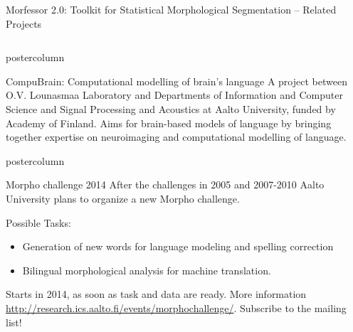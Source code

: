 \documentclass[final]{beamer} %
\newcommand{\collspace}{\vspace{6mm}}
\begin{document}
\begin{frame}{Morfessor 2.0: Toolkit for Statistical Morphological Segmentation -- Related Projects}
\begin{columns}
\begin{column}{.49\textwidth}
\begin{beamercolorbox}[center,wd=\textwidth]{postercolumn}
\begin{block}{CompuBrain: Computational modelling of brain's language}
A project between O.V. Lounasmaa Laboratory and Departments of
Information and Computer Science and Signal Processing and
 Acoustics at Aalto University, funded by Academy of Finland. Aims
 for brain-based models of language by bringing together expertise
 on neuroimaging and computational modelling of language.
            \end{block}
            
	\end{beamercolorbox}
\vfill
\collspace


  \begin{beamercolorbox}[center,wd=\textwidth]{postercolumn}
 \begin{block}{Morpho challenge 2014}
            After the challenges in 2005 and 2007-2010 Aalto University plans to organize a new Morpho challenge.

	Possible Tasks:       \begin{itemize}
		\item Generation of new words for language modeling and spelling correction
\item Bilingual morphological analysis for machine translation.
              \end{itemize}  

Starts in 2014, as soon as task and data are ready. More information \url{http://research.ics.aalto.fi/events/morphochallenge/}. Subscribe to the mailing list!
            \end{block}
            
	\end{beamercolorbox}




\end{column}
\end{columns}
\end{frame}
\end{document}
